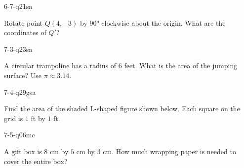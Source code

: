 \begin{practiceQuestion}{6-7-q21}{sa}
\begin{questionText}
Rotate point $Q(4, -3)$ by $90°$ clockwise about the origin. What are the coordinates of $Q'$?
\end{questionText}
\end{practiceQuestion}

\begin{practiceQuestion}{7-3-q23}{sa}
\begin{questionText}
A circular trampoline has a radius of $6$ feet. What is the area of the jumping surface? Use $\pi \approx 3.14$.
\end{questionText}
\end{practiceQuestion}

\begin{practiceQuestion}{7-4-q29}{gsa}
\begin{questionText}
Find the area of the shaded L-shaped figure shown below. Each square on the grid is $1$ ft by $1$ ft.

\begin{center}
\end{center}
\end{questionText}
\end{practiceQuestion}

\begin{practiceQuestion}{7-5-q06}{mc}
\begin{questionText}
A gift box is $8$ cm by $5$ cm by $3$ cm. How much wrapping paper is needed to cover the entire box?
\end{questionText}
\end{practiceQuestion}

